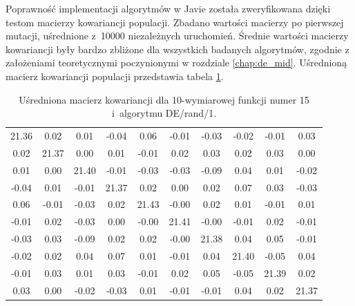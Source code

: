 \documentclass[a4paper,onecolumn,oneside,12pt,wide,floatssmall]{mwrep}
\theoremstyle{definition}
\theoremstyle{plain}%
\theoremstyle{remark}
\begin{document}
Poprawność implementacji algorytmów w Javie została zweryfikowana dzięki testom macierzy kowariancji
populacji. Zbadano wartości macierzy po pierwszej mutacji, uśrednione z~10000 niezależnych uruchomień. 
Średnie wartości macierzy kowariancji były bardzo zbliżone dla wszystkich badanych algorytmów, 
zgodnie z założeniami teoretycznymi poczynionymi w rozdziale
\ref{chap:de_mid}. Uśrednioną macierz kowariancji populacji przedstawia tabela 
\ref{table:cov_matrix}. 

\begin{table}[H]
\centering
\begin{tabular}{ c c c c c c c c c c }
21.36 & 0.02 & 0.01 & -0.04 & 0.06 & -0.01 & -0.03 & -0.02 & -0.01 & 0.03 \\
0.02 & 21.37 & 0.00 & 0.01 & -0.01 & 0.02 & 0.03 & 0.02 & 0.03 & 0.00 \\
0.01 & 0.00 & 21.40 & -0.01 & -0.03 & -0.03 & -0.09 & 0.04 & 0.01 & -0.02 \\
-0.04 & 0.01 & -0.01 & 21.37 & 0.02 & 0.00 & 0.02 & 0.07 & 0.03 & -0.03 \\
0.06 & -0.01 & -0.03 & 0.02 & 21.43 & -0.00 & 0.02 & 0.01 & -0.01 & 0.01 \\
-0.01 & 0.02 & -0.03 & 0.00 & -0.00 & 21.41 & -0.00 & -0.01 & 0.02 & -0.01 \\
-0.03 & 0.03 & -0.09 & 0.02 & 0.02 & -0.00 & 21.38 & 0.04 & 0.05 & -0.01 \\
-0.02 & 0.02 & 0.04 & 0.07 & 0.01 & -0.01 & 0.04 & 21.40 & -0.05 & 0.04 \\
-0.01 & 0.03 & 0.01 & 0.03 & -0.01 &  0.02 & 0.05 & -0.05 & 21.39 & 0.02 \\
0.03 & 0.00 & -0.02 & -0.03 & 0.01 & -0.01 & -0.01 &  0.04 & 0.02 & 21.37 \\
\end{tabular}
\caption{Uśredniona macierz kowariancji dla 10-wymiarowej funkcji numer 15 i~algorytmu DE/rand/1.}
\label{table:cov_matrix}
\end{table}
\end{document}
